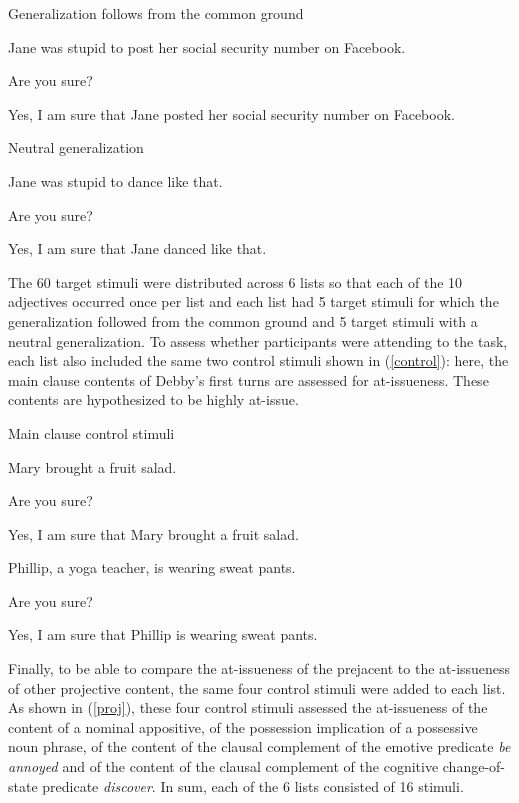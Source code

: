 \documentclass[11pt,fleqn]{article}
\newcommand{\6}{\mbox{$[\hspace*{-.6mm}[$}}
\newcommand{\9}{\mbox{$]\hspace*{-.6mm}]$}}
\begin{document}
\begin{exe}
\ex\label{sure2} Generalization follows from the common ground
\begin{xlist}
 Jane was stupid to post her social security number on Facebook. 

 Are you sure?

 Yes, I am sure that Jane posted her social security number on Facebook.
\end{xlist}

\ex\label{sure22} Neutral generalization
\begin{xlist}
 Jane was stupid to dance like that. 

 Are you sure?

 Yes, I am sure that Jane danced like that.
\end{xlist}
\end{exe}

The 60 target stimuli were distributed across 6 lists so that each of the 10 adjectives occurred once per list and each list had 5 target stimuli for which the generalization followed from the common ground and 5 target stimuli with a neutral generalization. To assess whether participants were attending to the task, each list also included the same two control stimuli shown in (\ref{control}): here, the main clause contents of Debby's first turns are assessed for at-issueness. These contents are hypothesized to be highly at-issue. 

\begin{exe}
\ex\label{control} Main clause control stimuli
\begin{xlist}
\ex
\begin{xlist}
 Mary brought a fruit salad.

 Are you sure?

 Yes, I am sure that Mary brought a fruit salad.
\end{xlist}
\ex 
\begin{xlist}
 Phillip, a yoga teacher, is wearing sweat pants.

 Are you sure?

 Yes, I am sure that Phillip is wearing sweat pants.
\end{xlist}
\end{xlist}
\end{exe}

Finally, to be able to compare the at-issueness of the prejacent to the at-issueness of other projective content, the same four control stimuli were added to each list. As shown in (\ref{proj}), these four control stimuli assessed the at-issueness of the content of a nominal appositive, of the possession implication of a possessive noun phrase, of the content of the clausal complement of the emotive predicate {\em be annoyed} and of the content of the clausal complement of the cognitive change-of-state predicate {\em discover}. In sum, each of the 6 lists consisted of 16 stimuli.
\end{document}

